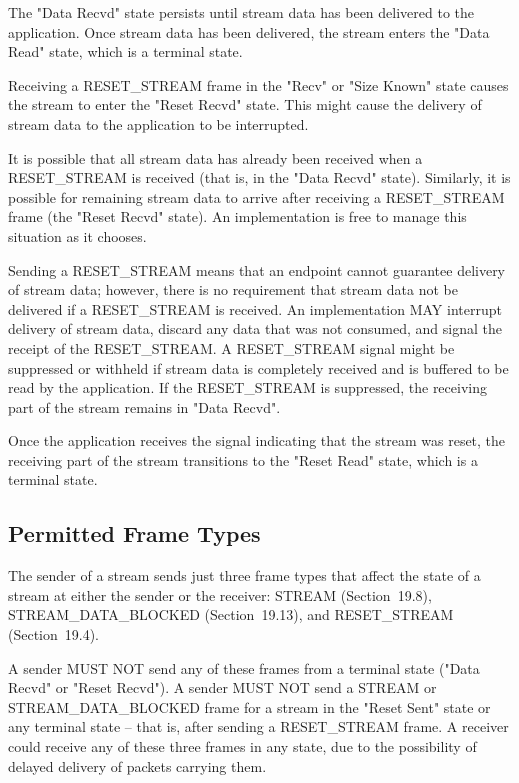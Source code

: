 \documentclass{article}
\begin{document}
The "Data Recvd" state persists until stream data has been delivered to the application.  Once stream data has been delivered, the stream enters the "Data Read" state, which is a terminal state.

Receiving a RESET\_STREAM frame in the "Recv" or "Size Known" state causes the stream to enter the "Reset Recvd" state.  This might cause the delivery of stream data to the application to be interrupted.

It is possible that all stream data has already been received when a RESET\_STREAM is received (that is, in the "Data Recvd" state). Similarly, it is possible for remaining stream data to arrive after receiving a RESET\_STREAM frame (the "Reset Recvd" state).  An implementation is free to manage this situation as it chooses.

Sending a RESET\_STREAM means that an endpoint cannot guarantee delivery of stream data; however, there is no requirement that stream data not be delivered if a RESET\_STREAM is received.  An implementation MAY interrupt delivery of stream data, discard any data that was not consumed, and signal the receipt of the RESET\_STREAM.  A RESET\_STREAM signal might be suppressed or withheld if stream data is completely received and is buffered to be read by the application.  If the RESET\_STREAM is suppressed, the receiving part of the stream remains in "Data Recvd".

Once the application receives the signal indicating that the stream was reset, the receiving part of the stream transitions to the "Reset Read" state, which is a terminal state.

\subsection{Permitted Frame Types}

The sender of a stream sends just three frame types that affect the state of a stream at either the sender or the receiver: STREAM (Section~19.8), STREAM\_DATA\_BLOCKED (Section~19.13), and RESET\_STREAM (Section~19.4).

A sender MUST NOT send any of these frames from a terminal state ("Data Recvd" or "Reset Recvd").  A sender MUST NOT send a STREAM or STREAM\_DATA\_BLOCKED frame for a stream in the "Reset Sent" state or any terminal state -- that is, after sending a RESET\_STREAM frame.  A receiver could receive any of these three frames in any state, due to the possibility of delayed delivery of packets carrying them.
\end{document}
